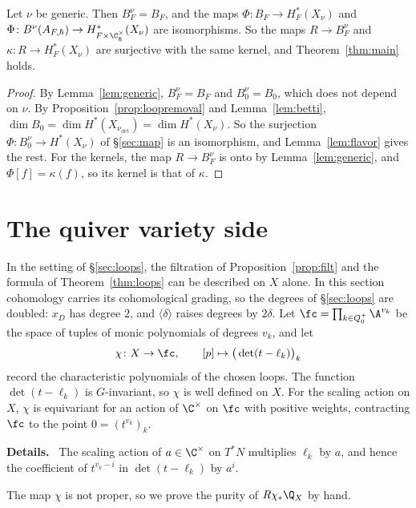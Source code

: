 \documentclass[11pt]{amsart}
\newenvironment{details}{\par\color{black!60!green}\noindent\textbf{Details.}\ }{\par}
\begin{document}
\begin{theorem}\label{thm:classical}
Let $\nu$ be generic.  Then $B^\nu_F=B_F$, and the maps
$\Phi\colon B_F\to H^*_F(X_\nu)$ and
$\Phi\colon B^\nu(A_{F,\hbar})\to H^*_{F\times\C^\times_\hbar}(X_\nu)$ are
isomorphisms.  So the maps $R\to B^\nu_F$ and $\kappa\colon R\to H^*_F(X_\nu)$
are surjective with the same kernel, and Theorem~\ref{thm:main} holds.
\end{theorem}

\begin{proof}
By Lemma~\ref{lem:generic}, $B^\nu_F=B_F$ and $B^\nu_0=B_0$, which does not
depend on $\nu$.  By Proposition~\ref{prop:loopremoval} and
Lemma~\ref{lem:betti}, $\dim B_0=\dim H^*(X_{\nu_{\det}})=\dim H^*(X_\nu)$.  So
the surjection $\Phi\colon B^\nu_0\to H^*(X_\nu)$ of \S\ref{sec:map} is an
isomorphism, and Lemma~\ref{lem:flavor} gives the rest.  For the kernels,
the map $R\to B^\nu_F$ is onto by
Lemma~\ref{lem:generic}, and $\Phi[f]=\kappa(f)$, so its kernel is that of
$\kappa$.
\end{proof}

\section{The quiver variety side}\label{sec:higgs}
In the setting of \S\ref{sec:loops}, the filtration of
Proposition~\ref{prop:filt} and the formula of Theorem~\ref{thm:loops} can
be described on $X$ alone.  In this section cohomology carries its
cohomological grading, so the degrees of \S\ref{sec:loops} are doubled: $x_D$
has degree $2$, and $\langle\delta\rangle$ raises degrees by $2\delta$.  Let $\fc=\prod_{k\in Q_0^+}\A^{v_k}$ be the
space of tuples of monic polynomials of degrees $v_k$, and let
\[
 \chi\colon X\to\fc,\qquad [p]\mapsto\big(\det(t-\ell_k)\big)_k
\]
record the characteristic polynomials of the chosen loops.  The function
$\det(t-\ell_k)$ is $G$-invariant, so $\chi$ is well defined on $X$.  For the
scaling action on $X$, $\chi$ is equivariant for an action of $\C^\times$ on
$\fc$ with positive weights, contracting $\fc$ to the point $0=(t^{v_k})_k$.
\begin{details}
The scaling action of $a\in\C^\times$ on $T^*N$ multiplies $\ell_k$ by
$a$, and hence the coefficient of $t^{v_k-i}$ in $\det(t-\ell_k)$ by $a^i$.
\end{details}
The map $\chi$ is
not proper, so we prove the purity of $R\chi_*\Q_X$ by hand.
\end{document}
